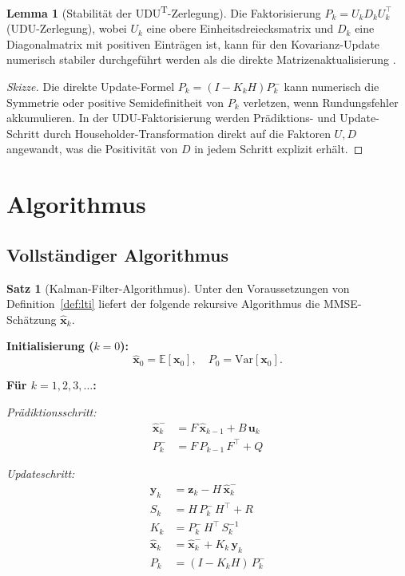 ﻿\documentclass[a4paper,12pt]{article}
\theoremstyle{definition}
\newtheorem{satz}{Satz}
\newtheorem{lemma}{Lemma}
\begin{document}
\begin{lemma}[Stabilität der UDU\textsuperscript{T}-Zerlegung]
    Die Faktorisierung $P_k = U_k D_k U_k^\top$ (UDU-Zerlegung), wobei $U_k$ eine
    obere Einheitsdreiecksmatrix und $D_k$ eine Diagonalmatrix mit positiven Einträgen ist,
    kann für den Kovarianz-Update numerisch stabiler durchgeführt werden als die direkte
    Matrizenaktualisierung \cite{bierman1977}.
\end{lemma}

\begin{proof}[Skizze]
Die direkte Update-Formel $P_k = (I - K_k H) P_k^-$ kann numerisch die
Symmetrie oder positive Semidefinitheit von $P_k$ verletzen, wenn Rundungsfehler
akkumulieren. In der UDU-Faktorisierung werden Prädiktions- und Update-Schritt
durch Householder-Transformation direkt auf die Faktoren $U, D$ angewandt,
was die Positivität von $D$ in jedem Schritt explizit erhält.
\end{proof}

\section{Algorithmus}

\subsection{Vollständiger Algorithmus}

\begin{satz}[Kalman-Filter-Algorithmus]
    Unter den Voraussetzungen von Definition~\ref{def:lti} liefert der folgende
    rekursive Algorithmus die MMSE-Schätzung $\hat{\mathbf{x}}_k$.
\end{satz}

\textbf{Initialisierung ($k=0$):}
\[
    \hat{\mathbf{x}}_0 = \mathbb{E}[\mathbf{x}_0], \quad P_0 = \mathrm{Var}[\mathbf{x}_0].
\]

\textbf{Für $k = 1, 2, 3, \ldots$:}

\emph{Prädiktionsschritt:}
\begin{align*}
    \hat{\mathbf{x}}_k^- &= F\,\hat{\mathbf{x}}_{k-1} + B\,\mathbf{u}_k \\
    P_k^-               &= F\,P_{k-1}\,F^\top + Q
\end{align*}

\emph{Updateschritt:}
\begin{align*}
    \mathbf{y}_k        &= \mathbf{z}_k - H\,\hat{\mathbf{x}}_k^- \\
    S_k                 &= H\,P_k^-\,H^\top + R \\
    K_k                 &= P_k^-\,H^\top\,S_k^{-1} \\
    \hat{\mathbf{x}}_k  &= \hat{\mathbf{x}}_k^- + K_k\,\mathbf{y}_k \\
    P_k                 &= (I - K_k H)\,P_k^-
\end{align*}
\end{document}
